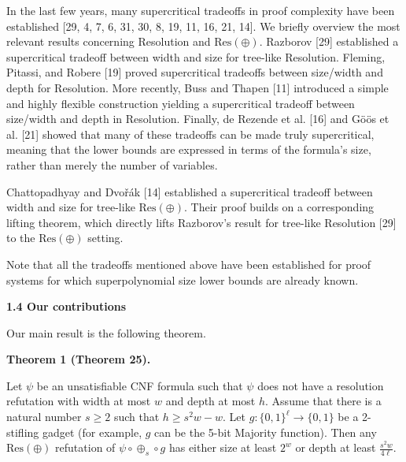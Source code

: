 \documentclass[10pt,a4paper]{article}
\begin{document}
In the last few years, many supercritical tradeoffs in proof complexity have been established
[29, 4, 7, 6, 31, 30, 8, 19, 11, 16, 21, 14].
We briefly overview the most relevant results concerning Resolution and $\mathrm{Res}(\oplus)$.
Razborov [29] established a supercritical tradeoff between width and size for tree-like Resolution.
Fleming, Pitassi, and Robere [19] proved supercritical
tradeoffs between size/width and depth for Resolution.
More recently, Buss and Thapen [11] introduced a simple and highly flexible construction
yielding a supercritical tradeoff between size/width and depth in Resolution.
Finally, de Rezende et al. [16] and Göös et al. [21] showed that many of
these tradeoffs can be made truly supercritical, meaning that the lower bounds are expressed in
terms of the formula’s size, rather than merely the number of variables.\par



Chattopadhyay and Dvořák [14] established a supercritical tradeoff between width and
size for tree-like $\mathrm{Res}(\oplus)$.
Their proof builds on a corresponding lifting theorem, which directly lifts Razborov’s result for
tree-like Resolution [29] to the $\mathrm{Res}(\oplus)$ setting.\par



Note that all the tradeoffs mentioned above have been established for proof systems for which
superpolynomial size lower bounds are already known.\par


\par\medskip\noindent\textbf{
1.4 Our contributions}\par


Our main result is the following theorem.\par



\par\medskip\noindent\textbf{
Theorem 1 (Theorem 25).
}\par



Let $\psi$ be an unsatisfiable CNF formula such that $\psi$ does not have
a resolution refutation with width at most $w$ and depth at most $h$.
Assume that there is a natural number $s\geq 2$ such that $h\geq s^{2}w-w$.
Let $g\colon\{0,1\}^{\ell}\to\{0,1\}$ be a 2-stifling gadget (for example,
$g$ can be the 5-bit Majority function).
Then any $\mathrm{Res}(\oplus)$ refutation of $\psi\circ\oplus_{s}\circ g$ has either
size at least $2^{w}$ or depth at least $\frac{s^{2}w}{4\ell}$.\par
\end{document}

